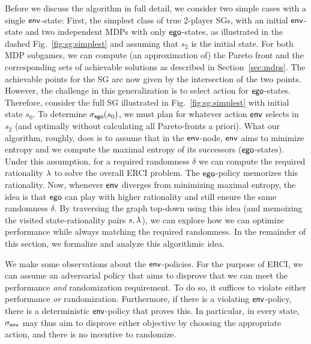 Before we discuss the algorithm in full detail, we consider two simple cases with a single $\mathsf{env}$-state: First, the simplest class of true 2-player SGs, with an initial $\mathsf{env}$-state and two independent MDPs with only $\mathsf{ego}$-states, as illustrated in the dashed Fig.~\ref{fig:sg:simplest} and assuming that $s_2$ is the initial state.
For both MDP subgames, we can compute (an approximation of) the Pareto front and the corresponding sets of achievable solutions as described in Section~\ref{sec:mdps}. 
The achievable points for the SG are now given by the intersection of the two points. 
However, the challenge in this generalization is to select action for $\mathsf{ego}$-states.
Therefore, consider the full SG illustrated in Fig.~\ref{fig:sg:simplest} with initial state $s_0$. 
To determine ${\sigma_{\mathsf{ego}}}(s_0)$, we must plan for whatever action $\mathsf{env}$ selects in $s_2$ (and optimally without calculating all Pareto-fronts a priori). 
What our algorithm, roughly, does is to assume that in the $\mathsf{env}$-node, $\mathsf{env}$ aims to minimize entropy and we compute the maximal entropy of its successors ($\mathsf{ego}$-states). Under this assumption, for a required randomness $\delta$ we can compute the required rationality $\lambda$ to solve the overall ERCI problem. The $\mathsf{ego}$-policy memorizes this rationality. Now, whenever $\mathsf{env}$ diverges from minimizing maximal entropy, the idea is that $\mathsf{ego}$ can play with higher rationality and still ensure the same randomness $\delta$.
By traversing the graph top-down using this idea (and memoizing the visited state-rationality pairs $s,\lambda$), we can explore how we can optimize performance while always matching the required randomness.  In the remainder of this section, we formalize and analyze this algorithmic idea.

We make some observations about the $\mathsf{env}$-policies. 
For the purpose of ERCI, we can assume an adversarial policy that aims to disprove that we can meet the performance \emph{and} randomization requirement. 
To do so, it suffices to violate either performance \emph{or} randomization. 
Furthermore, if there is a violating $\mathsf{env}$-policy, there is a deterministic $\mathsf{env}$-policy that proves this. 
In particular, in every state,  ${\sigma_{\mathsf{env}}}$ may thus aim to disprove either objective by choosing the appropriate action, and there is no incentive to randomize.


